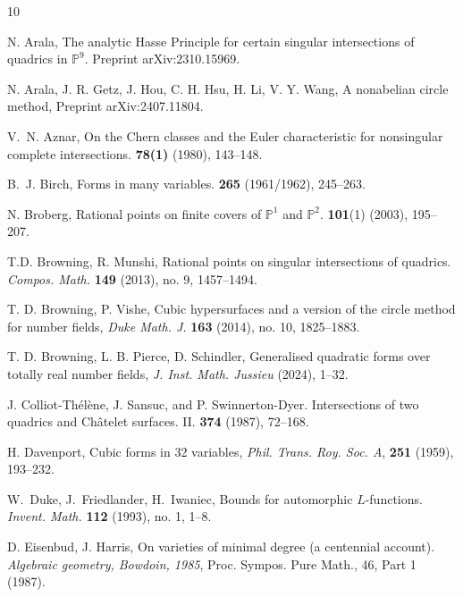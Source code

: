 \documentclass[letterpaper,11pt]{amsart}
\numberwithin{equation}{section}
\theoremstyle{definition}
\numberwithin{equation}{section}
\newcommand{\PP}{\mathbb{P}}
\begin{document}
  


\begin{thebibliography}{10}

 N. Arala, \newblock The analytic Hasse Principle for certain singular intersections of quadrics in $\PP^9$. Preprint arXiv:2310.15969.

N. Arala, J. R. Getz, J. Hou, C. H. Hsu, H. Li, V. Y. Wang, 
A nonabelian circle method, Preprint arXiv:2407.11804.



V.~N. Aznar, \newblock On the Chern classes and the Euler characteristic for nonsingular complete intersections.  \textbf{78(1)} (1980), 143--148.

B.~J. Birch,
\newblock Forms in many variables.
 \textbf{265} (1961/1962), 245--263.





N. Broberg,
\newblock Rational points on finite covers of {$\mathbb P^1$} and {$\mathbb P^2$}.
 \textbf{101}(1) (2003), 195--207.


T.D. Browning, R. Munshi,
Rational points on singular intersections of quadrics. 
\emph{Compos. Math.} \textbf{149} (2013), no. 9, 1457--1494.

T. D. Browning, P. Vishe, 
Cubic hypersurfaces and a version of the circle method for number fields, 
{\em Duke Math. J.} \textbf{163} (2014), no. 10, 1825--1883.

T. D. Browning, L. B. Pierce, D. Schindler, 
Generalised quadratic forms over totally real number fields, \emph{J. Inst. Math. Jussieu} (2024), 1--32. 


J. Colliot-Th\'{e}l\`ene, J. Sansuc, and P.
  Swinnerton-Dyer.
\newblock Intersections of two quadrics and {C}h\^{a}telet surfaces. {II}.
 \textbf{374} (1987), 72--168.

H. Davenport, 
Cubic forms in 32 variables, \emph{Phil. Trans. Roy. Soc. A}, \textbf{251} (1959), 193--232.


W.~Duke, J.~Friedlander, H.~Iwaniec,
 Bounds for automorphic {$L$}-functions.
 {\em Invent. Math.} \textbf{112} (1993), no. 1, 1--8.


D. Eisenbud, J. Harris,
On varieties of minimal degree (a centennial account). {\em Algebraic geometry, Bowdoin, 1985},
Proc. Sympos. Pure Math., 46, Part 1 (1987).


\end{thebibliography}
\end{document}
